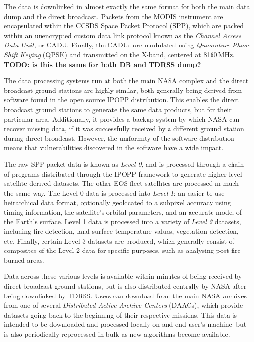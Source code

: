 
The data is downlinked in almost exactly the same format for both the main data dump and the direct broadcast.
Packets from the MODIS instrument are encapsulated wthin the CCSDS Space Packet Protocol (SPP), which are packed within an unencrypted custom data link protocol known as the \textit{Channel Access Data Unit}, or CADU.
Finally, the CADUs are modulated using \textit{Quadrature Phase Shift Keying} (QPSK) and transmitted on the X-band, centered at 8160\,MHz. \textbf{TODO: is this the same for both DB and TDRSS dump?}

The data processing systems run at both the main NASA complex and the direct broadcast ground stations are highly similar, both generally being derived from software found in the open source IPOPP distribution.
This enables the direct broadcast ground stations to generate the same data products, but for their particular area.
Additionally, it provides a backup system by which NASA can recover missing data, if it was successfully received by a different ground station during direct broadcast.
However, the uniformity of the software distribution means that vulnerabilities discovered in the software have a wide impact.

The raw SPP packet data is known as \textit{Level 0}, and is processed through a chain of programs distributed through the IPOPP framework to generate higher-level satellite-derived datasets.
The other EOS fleet satellites are processed in much the same way.
The Level 0 data is processed into \textit{Level 1}: an easier to use heirarchical data format, optionally geolocated to a subpixel accuracy using timing information, the satellite's orbital parameters, and an accurate model of the Earth's surface.
Level 1 data is processed into a variety of \textit{Level 2} datasets, including fire detection, land surface temperature values, vegetation detection, etc.
Finally, certain Level 3 datasets are produced, which generally consist of composites of the Level 2 data for specific purposes, such as analysing post-fire burned areas.

Data across these various levels is available within minutes of being received by direct broadcast ground stations, but is also distributed centrally by NASA after being downlinked by TDRSS.
Users can download from the main NASA archives from one of several \textit{Distributed Active Archive Centers} (DAACs), which provide datasets going back to the beginning of their respective missions.
This data is intended to be downloaded and processed locally on and end user's machine, but is also periodically reprocessed in bulk as new algorithms become available.

